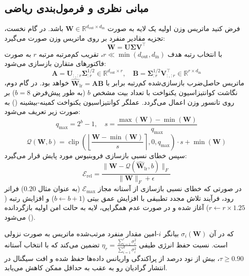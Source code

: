\subsection{مبانی نظری و فرمول‌بندی ریاضی}
فرض کنید ماتریس وزن اولیه یک لایه به صورت $\mathbf{W} \in \mathbb{R}^{d_{\text{out}} \times d_{\text{in}}}$ باشد. در گام نخست، تجزیه مقادیر منفرد بر روی ماتریس وزن صورت می‌گیرد:
\begin{equation}
\mathbf{W} = \mathbf{U} \mathbf{\Sigma} \mathbf{V}^\top
\end{equation}
با انتخاب رتبه هدف $r \ll \min(d_{\text{out}}, d_{\text{in}})$، تقریب کم‌مرتبه مرتبه $r$ به صورت فاکتورهای متقارن بازسازی می‌شود:
\begin{equation}
\mathbf{A} = \mathbf{U}_{:, :r} \mathbf{\Sigma}_{:r}^{1/2} \in \mathbb{R}^{d_{\text{out}} \times r}, \quad \mathbf{B} = \mathbf{\Sigma}_{:r}^{1/2} \mathbf{V}_{:, :r}^\top \in \mathbb{R}^{r \times d_{\text{in}}}
\end{equation}
ماتریس حاصل‌ضرب بازسازی‌شده کم‌رتبه برابر با $\hat{\mathbf{W}}_{\text{lr}} = \mathbf{A} \mathbf{B}$ خواهد بود. در گام دوم، نگاشت کوانتیزاسیون یکنواخت با تعداد بیت مشخص $b$ (به طور پیش‌فرض $b=8$) بر روی تانسور وزن اعمال می‌گردد. عملگر کوانتیزاسیون یکنواخت کمینه-بیشینه () به صورت زیر تعریف می‌شود:
\begin{equation}
q_{\text{max}} = 2^b - 1, \quad s = \frac{\max(\mathbf{W}) - \min(\mathbf{W})}{q_{\text{max}}}
\end{equation}
\begin{equation}
\mathcal{Q}(\mathbf{W}, b) = \operatorname{clip}\left(\left\lfloor \frac{\mathbf{W} - \min(\mathbf{W})}{s} \right\rceil, 0, q_{\text{max}}\right) \cdot s + \min(\mathbf{W})
\end{equation}
سپس خطای نسبی بازسازی فروبنیوس مورد پایش قرار می‌گیرد:
\begin{equation}
\mathcal{E}_{\text{rel}} = \frac{\|\mathbf{W} - \mathcal{Q}(\hat{\mathbf{W}}_{\text{lr}}, b)\|_F}{\|\mathbf{W}\|_F + \epsilon}
\end{equation}
در صورتی که خطای نسبی بازسازی از آستانه مجاز $\mathcal{E}_{\text{max}}$ (به عنوان مثال $0.20$) فراتر رود، فرآیند تلاش مجدد تطبیقی با افزایش عمق بیتی ($b \leftarrow b+1$) و افزایش رتبه ($r \leftarrow r \times 1.25$) آغاز شده و در صورت عدم همگرایی، لایه به حالت امن اولیه بازگردانده می‌شود ().

که در آن $\sigma_i(\mathbf{W})$ بیانگر $i$-امین مقدار منفرد مرتب‌شده ماتریس به صورت نزولی است. نسبت حفظ انرژی طیفی $\eta_r = \frac{\sum_{i=1}^r \sigma_i^2}{\sum_{i=1}^{d} \sigma_i^2}$ تضمین می‌کند که با انتخاب آستانه $\tau \ge 0.90$، بیش از نود درصد از پراکندگی واریانس داده‌ها حفظ شده و افت سیگنال در انتشار گرادیان رو به عقب به حداقل ممکن کاهش می‌یابد.


